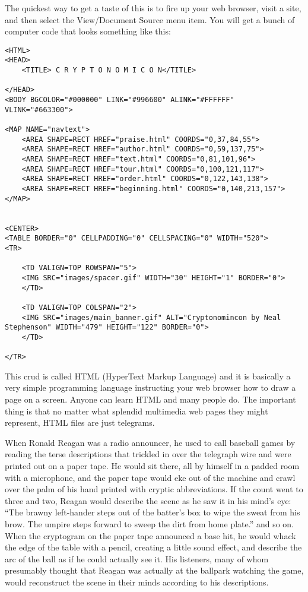 \documentclass[
  fontsize=11pt,
  paper=landscape,
  twocolumn=true,
  pagesize=pdftex,
  headings=small,
  DIV=15,
  ]{scrartcl}
\begin{document}
The quickest way to get a taste of this is to fire up your web browser,
visit a site, and then select the View/Document Source menu item. You
will get a bunch of computer code that looks something like this:

\begin{lstlisting}
<HTML>
<HEAD>
    <TITLE> C R Y P T O N O M I C O N</TITLE>

</HEAD>
<BODY BGCOLOR="#000000" LINK="#996600" ALINK="#FFFFFF" VLINK="#663300">

<MAP NAME="navtext">
    <AREA SHAPE=RECT HREF="praise.html" COORDS="0,37,84,55">
    <AREA SHAPE=RECT HREF="author.html" COORDS="0,59,137,75">
    <AREA SHAPE=RECT HREF="text.html" COORDS="0,81,101,96">
    <AREA SHAPE=RECT HREF="tour.html" COORDS="0,100,121,117">
    <AREA SHAPE=RECT HREF="order.html" COORDS="0,122,143,138">
    <AREA SHAPE=RECT HREF="beginning.html" COORDS="0,140,213,157">
</MAP>


<CENTER>
<TABLE BORDER="0" CELLPADDING="0" CELLSPACING="0" WIDTH="520">
<TR>

    <TD VALIGN=TOP ROWSPAN="5">
    <IMG SRC="images/spacer.gif" WIDTH="30" HEIGHT="1" BORDER="0">
    </TD>

    <TD VALIGN=TOP COLSPAN="2">
    <IMG SRC="images/main_banner.gif" ALT="Cryptonomincon by Neal
Stephenson" WIDTH="479" HEIGHT="122" BORDER="0">
    </TD>

</TR>  
\end{lstlisting}
This crud is called HTML (HyperText Markup Language) and it is basically
a very simple programming language instructing your web browser how to
draw a page on a screen. Anyone can learn HTML and many people do. The
important thing is that no matter what splendid multimedia web pages
they might represent, HTML files are just telegrams.

When Ronald Reagan was a radio announcer, he used to call baseball games
by reading the terse descriptions that trickled in over the telegraph
wire and were printed out on a paper tape. He would sit there, all by
himself in a padded room with a microphone, and the paper tape would eke
out of the machine and crawl over the palm of his hand printed with
cryptic abbreviations. If the count went to three and two, Reagan would
describe the scene as he saw it in his mind's eye: ``The brawny
left-hander steps out of the batter's box to wipe the sweat from his
brow. The umpire steps forward to sweep the dirt from home plate.'' and
so on. When the cryptogram on the paper tape announced a base hit, he
would whack the edge of the table with a pencil, creating a little sound
effect, and describe the arc of the ball as if he could actually see it.
His listeners, many of whom presumably thought that Reagan was actually
at the ballpark watching the game, would reconstruct the scene in their
minds according to his descriptions.
\end{document}
